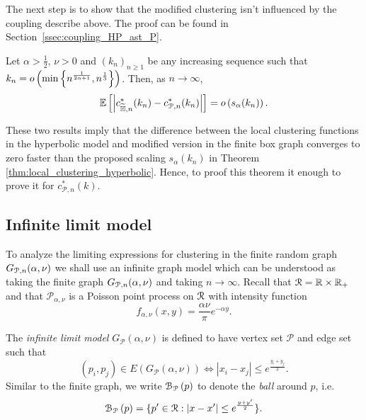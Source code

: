 The next step is to show that the modified clustering isn't influenced by the coupling describe above. The proof can be found in Section~\ref{ssec:coupling_HP_ast_P}.

\begin{proposition}\label{prop:couling_c_H_P}
Let $\alpha > \frac{1}{2}$, $\nu > 0$ and $(k_n)_{n\ge 1}$ be any increasing sequence such that $k_n = o\left(\min\left\{n^{\frac{1}{2\alpha + 1}}, n^{\frac{1}{3}}\right\}\right)$. Then, as $n \to \infty$,
\[
	\mathbb{E}\left[\left|c_{\widetilde{\mathbb{H}},n}^\ast(k_n) - c_{{\mathcal P},n}^\ast(k_n)\right|\right] = o\left(s_\alpha(k_n)\right).
\]
\end{proposition}

These two results imply that the difference between the local clustering functions in the hyperbolic model and modified version in the finite box graph converges to zero faster than the proposed scaling $s_\alpha(k_n)$ in Theorem \ref{thm:local_clustering_hyperbolic}. Hence, to proof this theorem it enough to prove it for $c_{\mathcal{P},n}^\ast(k)$. 

\subsection{Infinite limit model}\label{ssec:infinite_model}

To analyze the limiting expressions for clustering in the finite random graph $G_{{\mathcal P},n}(\alpha, \nu)$ we shall use an infinite graph model which can be understood as taking the finite graph $G_{{\mathcal P},n}(\alpha,\nu)$ and taking $n \to \infty$. Recall that ${\mathcal R} = \mathbb{R} \times \mathbb{R}_+$ and that $\mathcal{P}_{\alpha,\nu}$ is a Poisson point process on ${\mathcal R}$ with intensity function
\[
	f_{\alpha,\nu}(x,y) = \frac{\alpha \nu}{\pi} e^{-\alpha y}.
\]

The \emph{infinite limit model} $G_{\mathcal{P}}(\alpha, \nu)$ is defined to have vertex set $\mathcal{P}$ and edge set such that
\[
	(p_i, p_j) \in E(G_{\mathcal{P}}(\alpha, \nu)) \iff |x_i - x_j| \leq e^{\frac{y_i + y_j}{2}}.
\]
Similar to the finite graph, we write ${\mathcal B}_{{\mathcal P}}\left(p\right)$ to denote the \emph{ball} around $p$, i.e.
\begin{equation}\label{eq:def_ball_P}
	{\mathcal B}_{{\mathcal P}}\left(p\right) = \{p^\prime \in {\mathcal R} : |x - x^\prime| \leq e^{\frac{y + y^\prime}{2}}\}.
\end{equation}

